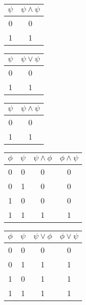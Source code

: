 \begin{table}[H]
    \centering
    \begin{tabular}{|c|c|}
        $\psi$ & $\psi \land \psi$ \\
        \hline
        0      & 0                 \\
        1      & 1                
    \end{tabular}
\end{table}

\begin{table}[H]
    \centering
    \begin{tabular}{|c|c|}
        $\psi$ & $\psi \lor \psi$ \\
        \hline
        0      & 0                 \\
        1      & 1                
    \end{tabular}
\end{table}
    
\begin{table}[H]
    \centering
    \begin{tabular}{|c|c|}
        $\psi$ & $\psi \land \psi$ \\
        \hline
        0      & 0                 \\
        1      & 1                
    \end{tabular}
\end{table}
    
\begin{table}[H]
    \centering
    \begin{tabular}{|c|c|c|c|}
        $\phi$ & $\psi$ & $\psi \land \phi$ & $\phi \land \psi$ \\ \hline
        0      & 0      & 0                 & 0                 \\
        0      & 1      & 0                 & 0                 \\
        1      & 0      & 0                 & 0                 \\
        1      & 1      & 1                 & 1                
    \end{tabular}
\end{table}  
    
\begin{table}[H]
    \centering
    \begin{tabular}{|c|c|c|c|}
        $\phi$ & $\psi$ & $\psi \lor \phi$ & $\phi \lor \psi$ \\ \hline
        0      & 0      & 0                 & 0                 \\
        0      & 1      & 1                 & 1                 \\
        1      & 0      & 1                 & 1                 \\
        1      & 1      & 1                 & 1                
        \end{tabular}
\end{table} 
    
